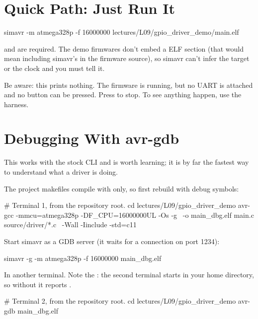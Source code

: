 \section{Quick Path: Just Run It}
\label{sim:sec:quick}

\begin{shell}
simavr -m atmega328p -f 16000000 lectures/L09/gpio_driver_demo/main.elf
\end{shell}

\noindent{} and  are required. The demo firmwares don't embed a  ELF
section (that would mean including simavr's  in the firmware source), so
simavr can't infer the target or the clock and you must tell it.

Be aware: this prints nothing. The firmware is running, but no UART is attached and no button can
be pressed. Press  to stop. To see anything happen, use the harness.

\section{Debugging With avr-gdb}
\label{sim:sec:gdb}
This works with the stock CLI and is worth learning; it is by far the fastest way to understand
what a driver is doing.

The project makefiles compile with  only, so first rebuild with debug symbols:

\begin{shell}
# Terminal 1, from the repository root.
cd lectures/L09/gpio_driver_demo
avr-gcc -mmcu=atmega328p -DF_CPU=16000000UL -Os -g \
    -o main_dbg.elf main.c source/driver/*.c \
    -Wall -Iinclude -std=c11
\end{shell}

\noindent Start simavr as a GDB server (it waits for a connection on port 1234):

\begin{shell}
simavr -g -m atmega328p -f 16000000 main_dbg.elf
\end{shell}

\noindent In another terminal. Note the : the second terminal starts in your home
directory, so without it  reports .

\begin{shell}
# Terminal 2, from the repository root.
cd lectures/L09/gpio_driver_demo
avr-gdb main_dbg.elf
\end{shell}

